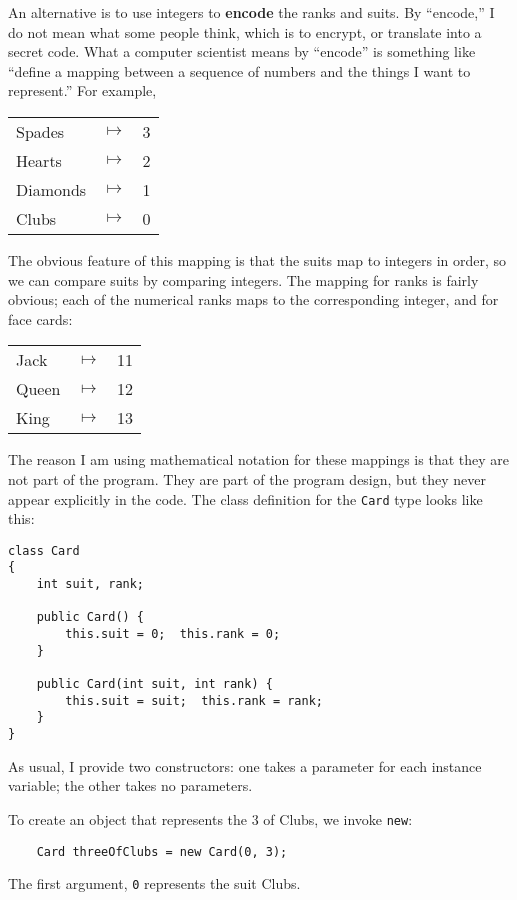 \documentclass[12pt]{book}
\theoremstyle{definition}
\begin{document}

An alternative is to use integers to {\bf encode} the ranks and
suits.  By ``encode,'' I do not mean what some people think, which
is to encrypt, or translate into a secret code.  What a computer
scientist means by ``encode'' is something like ``define a mapping
between a sequence of numbers and the things I want to represent.''
For example,

\begin{tabular}{l c l}
Spades & $\mapsto$ & 3 \\
Hearts & $\mapsto$ & 2 \\
Diamonds & $\mapsto$ & 1 \\
Clubs & $\mapsto$ & 0
\end{tabular}

The obvious feature of this mapping is that the suits map to
integers in order, so we can compare suits by comparing integers.
The mapping for ranks is fairly obvious; each of the numerical
ranks maps to the corresponding integer, and for face cards:

\begin{tabular}{l c l}
Jack & $\mapsto$ & 11 \\
Queen & $\mapsto$ & 12 \\
King & $\mapsto$ & 13 \\
\end{tabular}

The reason I am using mathematical notation for these mappings is
that they are not part of the program.  They are part of the
program design, but they never appear explicitly in the code.
The class definition for the {\tt Card} type looks like this:

\begin{lstlisting}
class Card
{
    int suit, rank;

    public Card() { 
        this.suit = 0;  this.rank = 0;
    }

    public Card(int suit, int rank) { 
        this.suit = suit;  this.rank = rank;
    }
}
\end{lstlisting}

As usual, I provide two constructors: one takes
a parameter for each instance variable; the other
takes no parameters.


To create an object that represents the 3 of Clubs, we invoke {\tt new}:

\begin{lstlisting}
    Card threeOfClubs = new Card(0, 3);
\end{lstlisting}
%
The first argument, {\tt 0} represents the suit Clubs.
\end{document}
